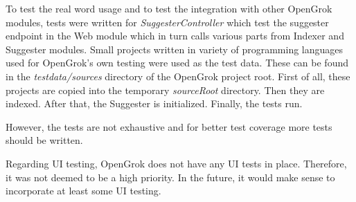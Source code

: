 To test the real word usage and to test the integration with other OpenGrok modules,
tests were written for \textit{SuggesterController} which test the
suggester endpoint in the Web module which in turn calls various parts from Indexer and Suggester modules.
Small projects written in variety of programming languages used for OpenGrok's own testing were used as the test data.
These can be found in the \textit{testdata/sources} directory of the OpenGrok project root.
First of all, these projects are copied into the temporary \textit{sourceRoot} directory. Then they are indexed.
After that, the Suggester is initialized. Finally, the tests run.

However, the tests are not exhaustive and for better test coverage more tests should be written.

Regarding UI testing, OpenGrok does not have any UI tests in place. Therefore, it was not deemed to be a high priority.
In the future, it would make sense to incorporate at least some UI testing.